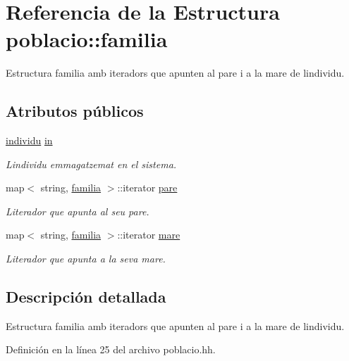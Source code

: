 \hypertarget{structpoblacio_1_1familia}{}\section{Referencia de la Estructura poblacio\+:\+:familia}
\label{structpoblacio_1_1familia}


Estructura familia amb iteradors que apunten al pare i a la mare de l\textquotesingle{}individu.  


\subsection*{Atributos públicos}
\begin{DoxyCompactItemize}
\item 
\hyperlink{classindividu}{individu} \hyperlink{structpoblacio_1_1familia_a184e9fe52d7cf62ca133ac1d900f87ea}{in}
\begin{DoxyCompactList}\small\item\em L\textquotesingle{}individu emmagatzemat en el sistema. \end{DoxyCompactList}\item 
map$<$ string, \hyperlink{structpoblacio_1_1familia}{familia} $>$\+::iterator \hyperlink{structpoblacio_1_1familia_af87f56b016ade8b4bb02a49036de5f74}{pare}
\begin{DoxyCompactList}\small\item\em L\textquotesingle{}iterador que apunta al seu pare. \end{DoxyCompactList}\item 
map$<$ string, \hyperlink{structpoblacio_1_1familia}{familia} $>$\+::iterator \hyperlink{structpoblacio_1_1familia_a9d44bf543d7f856a93feac40de233c42}{mare}
\begin{DoxyCompactList}\small\item\em L\textquotesingle{}iterador que apunta a la seva mare. \end{DoxyCompactList}\end{DoxyCompactItemize}


\subsection{Descripción detallada}
Estructura familia amb iteradors que apunten al pare i a la mare de l\textquotesingle{}individu. 

Definición en la línea 25 del archivo poblacio.\+hh.



